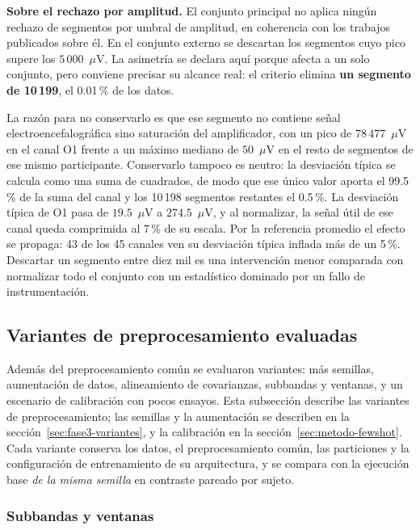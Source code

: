 \textbf{Sobre el rechazo por amplitud.} El conjunto principal no aplica ningún
rechazo de segmentos por umbral de amplitud, en coherencia con los trabajos publicados sobre él.
En el conjunto externo se descartan los segmentos cuyo pico supere los
$5\,000$~$\mu$V. La asimetría se declara aquí porque afecta a un solo
conjunto, pero conviene precisar su alcance real: el criterio elimina
\textbf{un segmento de 10\,199}, el 0.01\,\% de los datos.

La razón para no conservarlo es que ese segmento no contiene señal
electroencefalográfica sino saturación del amplificador, con un pico de
$78\,477$~$\mu$V en el canal O1 frente a un máximo mediano de
$50$~$\mu$V en el resto de segmentos de ese mismo participante.
Conservarlo tampoco es neutro: la desviación típica se calcula como una suma de
cuadrados, de modo que ese único valor aporta el 99.5\,\% de la suma del canal y
los 10\,198 segmentos restantes el 0.5\,\%. La desviación típica de O1 pasa de
$19.5$~$\mu$V a $274.5$~$\mu$V, y al normalizar, la señal
útil de ese canal queda comprimida al 7\,\% de su escala. Por la referencia
promedio el efecto se propaga: 43 de los 45 canales ven su desviación típica
inflada más de un 5\,\%. Descartar un segmento entre diez mil es una intervención
menor comparada con normalizar todo el conjunto con un estadístico dominado por un
fallo de instrumentación.

\subsection{Variantes de preprocesamiento evaluadas}
\label{sec:variantes-preproc}

Además del preprocesamiento común se evaluaron variantes: más semillas, aumentación de datos, alineamiento de covarianzas, subbandas y ventanas, y un
escenario de calibración con pocos ensayos. Esta subsección describe las variantes de
preprocesamiento; las semillas y la aumentación se describen en la
sección~\ref{sec:fase3-variantes}, y la calibración en la sección~\ref{sec:metodo-fewshot}.
Cada variante conserva los datos, el preprocesamiento común, las particiones y la
configuración de entrenamiento de su arquitectura, y se compara con la ejecución base
\emph{de la misma semilla} en contraste pareado por sujeto.

\subsubsection{Subbandas y ventanas}
\label{sec:variantes-banda}

